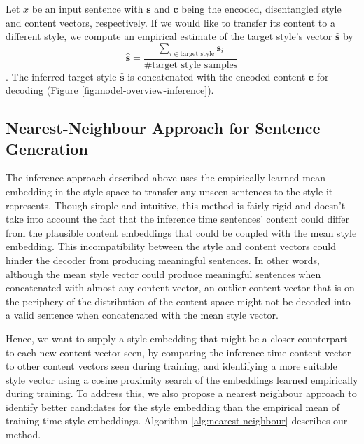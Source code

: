 Let $x$ be an input sentence with $\bm s$ and $\bm c$ being the encoded, disentangled style and content vectors, respectively. If we would like to transfer its content to a different style, we compute an empirical estimate of the target style's vector $\hat{\bm s}$ by
$$\hat{\bm s}=\frac{\sum_{i\in\text{target style}}\bm s_i}{\text{\# target style samples}}$$. The inferred target style $\hat{\bm s}$ is concatenated with the encoded content $\bm c$ for decoding (Figure \ref{fig:model-overview-inference}).


\subsection{Nearest-Neighbour Approach for Sentence Generation} \label{ssec:nearest-neighbour-inference}

The inference approach described above uses the empirically learned mean embedding in the style space to transfer any unseen sentences to the style it represents. Though simple and intuitive, this method is fairly rigid and doesn't take into account the fact that the inference time sentences' content could differ from the plausible content embeddings that could be coupled with the mean style embedding. This incompatibility between the style and content vectors could hinder the decoder from producing meaningful sentences. In other words, although the mean style vector could produce meaningful sentences when concatenated with almost any content vector, an outlier content vector that is on the periphery of the distribution of the content space might not be decoded into a valid sentence when concatenated with the mean style vector.

Hence, we want to supply a style embedding that might be a closer counterpart to each new content vector seen, by comparing the inference-time content vector to other content vectors seen during training, and identifying a more suitable style vector using a cosine proximity search of the embeddings learned empirically during training. To address this, we also propose a nearest neighbour approach to identify better candidates for the style embedding than the empirical mean of training time style embeddings. Algorithm \ref{alg:nearest-neighbour} describes our method.

